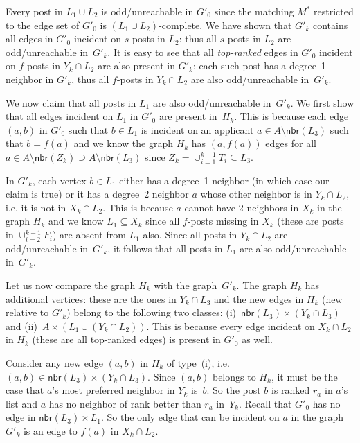 \documentclass[11pt]{llncs}
\newcommand{\Nbr}{\mathsf{nbr}}
\begin{document}
Every post in $L_1 \cup L_2$ is odd/unreachable in $G'_0$ since the matching $M^*$ restricted 
to the edge set of $G'_0$ is $(L_1 \cup L_2)$-complete. We have shown that $G'_k$ contains all 
edges in $G'_0$ incident on $s$-posts in $L_2$: thus all $s$-posts in $L_2$ 
are odd/unreachable in~$G'_k$. It is easy to see that all {\em top-ranked} edges in 
$G'_0$ incident on $f$-posts in $Y_k \cap L_2$ are also present in $G'_k$: each such post has 
a degree~1 neighbor in $G'_k$, thus all $f$-posts in $Y_k \cap L_2$ are also odd/unreachable 
in~$G'_k$.

We now claim that all posts in $L_1$ are also odd/unreachable in~$G'_k$. We first show that 
all edges incident on $L_1$ in $G'_0$ are present in~$H_k$. This is because each edge $(a,b)$ 
in $G'_0$ such that $b \in L_1$ is incident on an applicant $a \in A\setminus\Nbr(L_3)$ such 
that $b = f(a)$ and we know the graph $H_k$ has $(a,f(a))$ edges for all 
$a \in A\setminus\Nbr(Z_k) \supseteq A\setminus\Nbr(L_3)$ since 
$Z_k = \cup_{i=1}^{k-1}T_i \subseteq L_3$.


In $G'_k$, each vertex $b \in L_1$ either has a degree~1 neighbor (in which case our claim is 
true) or it has a degree~2 neighbor $a$ whose other neighbor is in $Y_k \cap L_2$, i.e.
it is not in $X_k \cap L_2$. This is because $a$ cannot have 2 neighbors in $X_k$ in the graph 
$H_k$ and we know $L_1 \subseteq X_k$ since all $f$-posts missing in $X_k$ (these are posts in 
$\cup_{i=2}^{k-1}F_i$) are absent from $L_1$ also. Since all posts in $Y_k \cap L_2$ 
are odd/unreachable in~$G'_k$, it follows that all posts in $L_1$ are also odd/unreachable 
in~$G'_k$.

\smallskip

Let us now compare the graph $H_k$ with the graph~$G'_k$. The graph $H_k$ has additional 
vertices: these are the ones in $Y_k \cap L_3$ and the new edges in $H_k$ (new relative to $G'_k$)
 belong to the following two classes: (i)~$\Nbr(L_3)\times(Y_k \cap L_3)$
and (ii)~$A \times (L_1 \cup (Y_k \cap L_2))$. This is because every edge incident on 
$X_k \cap L_2$ in $H_k$ (these are all top-ranked edges) is present in $G'_0$ as well. 

Consider any new edge $(a,b)$ in $H_k$ of type~(i), 
i.e.\ $(a,b) \in \Nbr(L_3)\times(Y_k \cap L_3)$. Since $(a,b)$ belongs to $H_k$, it must be 
the case that $a$'s most preferred neighbor in $Y_k$ is~$b$. So the post $b$ is
ranked $r_a$ in $a$'s list and $a$ has no neighbor of rank better than $r_a$ in~$Y_k$. 
Recall that $G'_0$ has no edge in  $\Nbr(L_3)\times L_1$. So the only edge that can be incident 
on $a$ in the graph $G'_k$ is an edge to $f(a)$ in $X_k \cap L_2$. 
\end{document}
